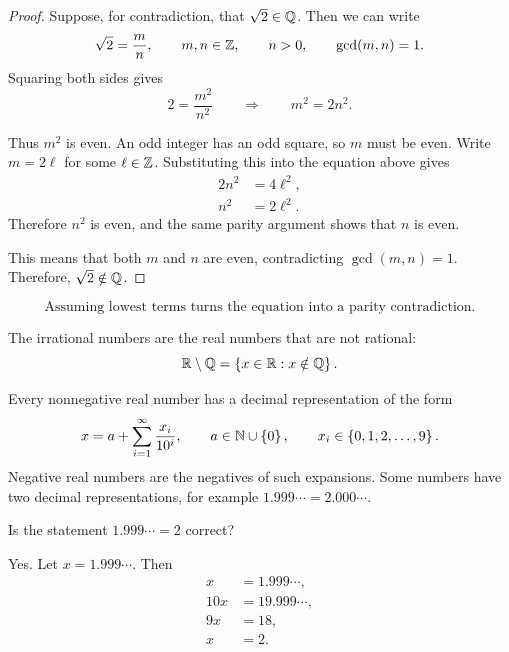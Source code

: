 \begin{proof}
    Suppose, for contradiction, that $\sqrt{2}\in\mathbb{Q}$. Then we can write
    \begin{equation*}
        \sqrt{2}=\frac{m}{n},
        \qquad m,n\in\mathbb{Z},
        \qquad n>0,
        \qquad \gcd(m,n)=1.
    \end{equation*}
    Squaring both sides gives
    \begin{equation*}
        2=\frac{m^2}{n^2}
        \qquad\Longrightarrow\qquad
        m^2=2n^2.
    \end{equation*}

    Thus $m^2$ is even. An odd integer has an odd square, so $m$ must be even. Write $m=2\ell$ for some $\ell\in\mathbb{Z}$. Substituting this into the equation above gives
    \begin{align*}
        2n^2 &= 4\ell^2, \\
        n^2 &= 2\ell^2.
    \end{align*}
    Therefore $n^2$ is even, and the same parity argument shows that $n$ is even.

    This means that both $m$ and $n$ are even, contradicting $\gcd(m,n)=1$. Therefore, $\sqrt{2}\notin\mathbb{Q}$.
\end{proof}

\[\boxed{\text{Assuming lowest terms turns the equation into a parity contradiction.}}\]

The irrational numbers are the real numbers that are not rational:
\begin{equation*}
    \mathbb{R}\setminus\mathbb{Q}
    =\left\{x\in\mathbb{R} : x\notin\mathbb{Q}\right\}.
\end{equation*}

\begin{example}
Every nonnegative real number has a decimal representation of the form
\begin{equation*}
    x=a+\sum_{i=1}^{\infty}\frac{x_i}{10^i},
    \qquad a\in\mathbb{N}\cup\left\{0\right\},
    \qquad x_i\in\left\{0,1,2,\ldots,9\right\}.
\end{equation*}
Negative real numbers are the negatives of such expansions. Some numbers have two decimal representations, for example $1.999\cdots=2.000\cdots$.
\end{example}

\begin{example}
    Is the statement $1.999\cdots = 2$ correct?

    Yes. Let $x=1.999\cdots$. Then
    \begin{align*}
        x &= 1.999\cdots, \\
        10x &= 19.999\cdots, \\
        9x &= 18, \\
        x &= 2.
    \end{align*}
\end{example}

